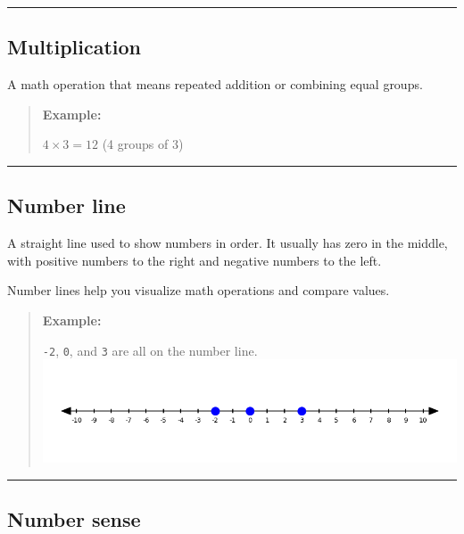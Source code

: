 \documentclass[
  letterpaper,
  DIV=11,
  numbers=noendperiod]{scrreprt}
\begin{document}
\begin{center}\rule{0.5\linewidth}{0.5pt}\end{center}

\subsection*{Multiplication}\label{glossary-multiplication}

A math operation that means repeated addition or combining equal groups.

\begin{quote}
\textbf{Example:}

\(4 \times 3 = 12\) (4 groups of 3)
\end{quote}

\begin{center}\rule{0.5\linewidth}{0.5pt}\end{center}

\subsection*{Number line}\label{glossary-number-line}

A straight line used to show numbers in order. It usually has zero in
the middle, with positive numbers to the right and negative numbers to
the left.

Number lines help you visualize math operations and compare values.

\begin{quote}
\textbf{Example:}

\texttt{-2}, \texttt{0}, and \texttt{3} are all on the number line.
\includegraphics[width=1\linewidth,height=\textheight,keepaspectratio]{images/Glossary/number_line_example.png}
\end{quote}

\begin{center}\rule{0.5\linewidth}{0.5pt}\end{center}

\subsection*{Number sense}\label{glossary-number-sense}
\end{document}
